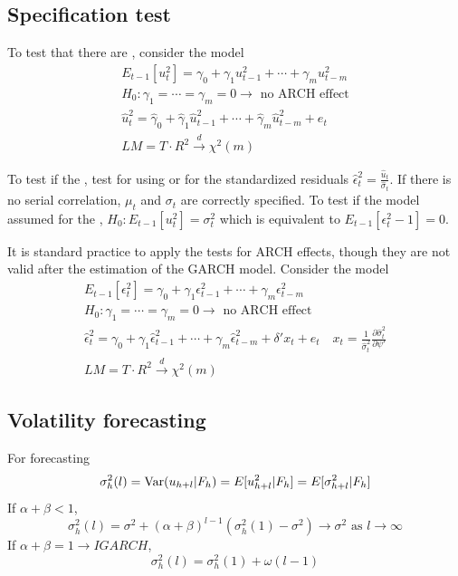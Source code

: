 \subsection{Specification test}

To test that there are , consider the model 
\begin{gather*}
    E_{t-1}[u^2_t] = \gamma_0 + \gamma_1 u^2_{t-1}+\cdots+\gamma_m u^2_{t-m}\\
    H_0: \gamma_1 = \cdots = \gamma_m = 0 \to \text{ no ARCH effect}\\
    \hat{u}^2_t = \hat{\gamma}_0 + \hat{\gamma}_1\hat{u}^2_{t-1}+\cdots + \hat{\gamma}_m\hat{u}^2_{t-m} + e_t\\
    LM = T\cdot R^2 \xrightarrow{d} \chi^2(m)
\end{gather*}

To test if the , test for  using  or  for the standardized residuals $\hat{\epsilon}^2_t = \frac{\hat{u}_t}{\hat{\sigma}_t}$.
If there is no serial correlation, $\mu_t$ and $\sigma_t$ are correctly specified.
To test if the model assumed for the , $H_0 : E_{t-1}[u^2_t] = \sigma^2_t$ which is equivalent to $E_{t-1}[\epsilon^2_t-1] = 0$.

It is standard practice to apply the tests for ARCH effects, though they are not valid after the estimation of the GARCH model.
Consider the model 
\begin{gather*}
    E_{t-1}[\epsilon^2_t] = \gamma_0 + \gamma_1 \epsilon^2_{t-1}+\cdots+\gamma_m \epsilon^2_{t-m}\\
    H_0: \gamma_1 = \cdots = \gamma_m = 0 \to \text{ no ARCH effect}\\
    \hat{\epsilon}^2_t = \gamma_0 + \gamma_1\hat{\epsilon}^2_{t-1}+\cdots + \gamma_m\hat{\epsilon}^2_{t-m} + \delta' x_t + e_t\quad x_t = \frac{1}{\hat{\sigma}^2_t}\frac{\partial\hat{\sigma}^2_t}{\partial\psi'}\\
    LM = T\cdot R^2 \xrightarrow{d} \chi^2(m)
\end{gather*}

\subsection{Volatility forecasting}
For  forecasting
\begin{equation*}
    \sigma^2_h(l) = \operatorname{Var}(u_{h+l}|F_h) = E[u^2_{h+l}|F_h] = E[\sigma^2_{h+l}|F_h]
\end{equation*}
If $\alpha + \beta <1$,
\begin{equation*}
    \sigma^2_h(l) = \sigma^2 + (\alpha + \beta)^{l-1} (\sigma^2_h(1) - \sigma^2) \to \sigma^2 \text{ as } l\to\infty
\end{equation*}
If $\alpha + \beta =1\to IGARCH$,
\begin{equation*}
    \sigma^2_h(l) =\sigma^2_h(1) + \omega(l-1)
\end{equation*}


